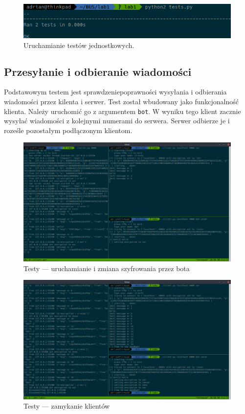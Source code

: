 \documentclass[a4paper]{article}
\begin{document}
\begin{figure}[H]
	\center
	\includegraphics[width=.6\textwidth]{img/tests.png}
	\caption{Uruchamianie testów jednostkowych.}
\end{figure}

\subsection{Przesyłanie i odbieranie wiadomości}
Podstawowym testem jest sprawdzeniepoprawności wysyłania i odbierania wiadomości przez kilenta i serwer. Test został wbudowany jako funkcjonalność klienta. Należy uruchomić go z argumentem \texttt{bot}. W wyniku tego klient zacznie wysyłać wiadomości z kolejnymi numerami do serwera. Serwer odbierze je i roześle pozostałym podłączonym klientom.

\begin{figure}[H]
	\center
	\includegraphics[width=.8\textwidth]{img/testbot.png}
	\caption{Testy --- uruchamianie i zmiana szyfrowania przez bota}
\end{figure}

\begin{figure}[H]
	\center
\includegraphics[width=.8\textwidth]{img/testbot2.png}
\caption{Testy --- zamykanie klientów}
\end{figure}
\end{document}
